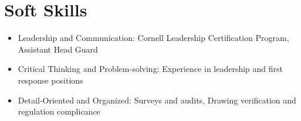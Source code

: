 \documentclass[12pt]{article}       %
\begin{document}
\section*{Soft Skills}
\begin{itemize}
      \item {Leadership and Communication:} Cornell Leadership Certification Program, Assistant Head Guard
      \item {Critical Thinking and Problem-solving:} Experience in leadership and first response positions
      \item {Detail-Oriented and Organized:} Surveys and audits, Drawing verification and regulation complicance
\end{itemize}
\vspace{-6.5pt}

\end{document}
